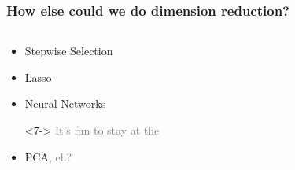 \documentclass[xcolor={dvipsnames}]{beamer}
\begin{document}
\frame
{
 \frametitle{How else could we do dimension reduction?}

\begin{columns}
\begin{column}{.4\textwidth}

\begin{itemize}
\item<2-> Stepwise Selection
\item[]
\item[]
\item<3-> Lasso
\item[]
\item[]
\item[]
\item[]
\item<4-> Neural Networks
\item[]
\item[]
\item[]
\item[]<7-> \textcolor{gray}{It's fun to stay at the}
\item<7-> PCA\textcolor{gray}{, eh?}  
\end{itemize}

\end{column}
\begin{column}{.65\textwidth}

${}$\\${}$\\


${}$\\${}$\\


\end{column}
\end{columns}}
\end{document}
